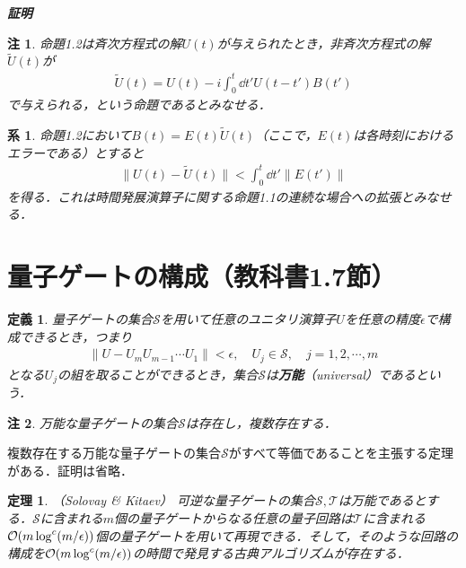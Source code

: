 \documentclass[dvipdfmx]{jarticle}
\makeatletter
\numberwithin{equation}{section}
\renewenvironment{proof}[1][\proofname]{\par
  \pushQED{\qed}
  \normalfont \topsep6\p@\@plus6\p@\relax
  \trivlist
  \item\relax
  {\itshape
  #1\@addpunct{ }}\hspace\labelsep\ignorespaces
}{
  \popQED\endtrivlist\@endpefalse
}
\theoremstyle{seminar}
\newtheorem{theorem}{定理}[section]
\newtheorem{definition}{定義}[section]
\newtheorem{corollary}{系}[section]
\newtheorem{remark}{注}[section]
\renewcommand{\proofname}{\textbf{証明}}
\makeatother
\begin{document}
\begin{proof}
  
\end{proof}

\begin{remark}
  命題1.2は斉次方程式の解$U(t)$が与えられたとき，非斉次方程式の解$\tilde{U}(t)$が
  \begin{align}
    \tilde{U}(t) = U(t) - i\int_0^t \dd t' U(t - t')B(t')
  \end{align}
  で与えられる，という命題であるとみなせる．
\end{remark}

\begin{corollary}
  命題1.2において$B(t) = E(t)\tilde{U}(t)$（ここで，$E(t)$は各時刻におけるエラーである）とすると
  \begin{align}
    \| U(t) - \tilde{U}(t) \| < \int_0^t \dd t' \| E(t') \|
  \end{align}
  を得る．これは時間発展演算子に関する命題1.1の連続な場合への拡張とみなせる．
\end{corollary}
\section{量子ゲートの構成（教科書1.7節）}

\begin{definition}
  量子ゲートの集合$\mathcal{S}$を用いて任意のユニタリ演算子$U$を任意の精度$\epsilon$で構成できるとき，つまり
  \begin{align}
    \| U - U_m U_{m-1} \cdots U_1 \| < \epsilon, \quad U_j \in \mathcal{S}, \quad j = 1, 2, \cdots, m
  \end{align}
  となる$U_j$の組を取ることができるとき，集合$\mathcal{S}$は{\bf 万能}（universal）であるという．
\end{definition}

\begin{remark}
  万能な量子ゲートの集合$\mathcal{S}$は存在し，複数存在する．
\end{remark}

複数存在する万能な量子ゲートの集合$\mathcal{S}$がすべて等価であることを主張する定理がある．証明は省略．
\begin{theorem}（Solovay \& Kitaev）
  可逆な量子ゲートの集合$\mathcal{S}, \mathcal{T}$は万能であるとする．$\mathcal{S}$に含まれる$m$個の量子ゲートからなる任意の量子回路は$\mathcal{T}$に含まれる$\mathcal{O}\qty(m \log^c (m / \epsilon))$個の量子ゲートを用いて再現できる．そして，そのような回路の構成を$\mathcal{O}\qty(m \log^c (m / \epsilon))$の時間で発見する古典アルゴリズムが存在する．
\end{theorem}
\end{document}
